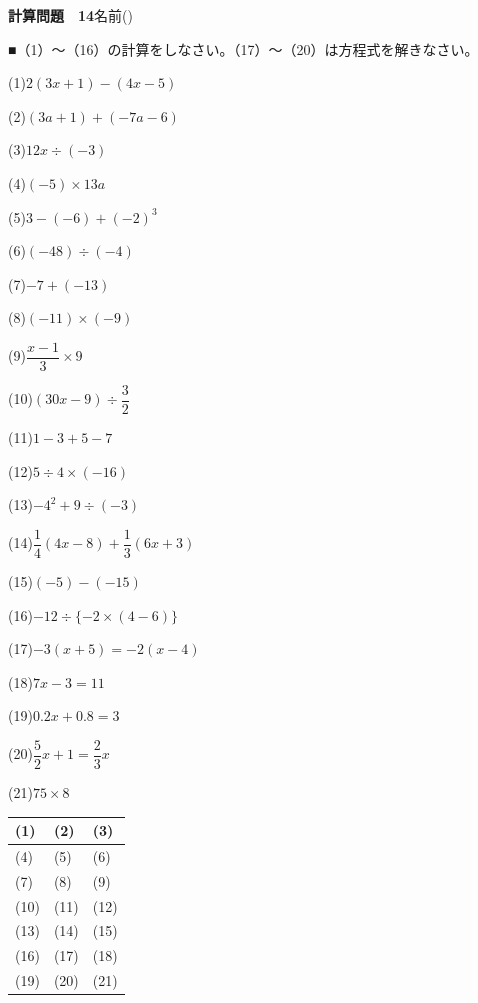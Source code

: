 \documentclass[a4paper,11pt]{ltjsarticle}
\newlength{\qcol}\setlength{\qcol}{0.47\textwidth}
\newlength{\qgap}
\newlength{\anscolw}\setlength{\anscolw}{0.30\textwidth}
\newlength{\ansh}
\newcommand{\Q}[2]{\parbox[t]{\qcol}{\raggedright (#1)\hspace{0.6em}$\displaystyle #2$}}
\newcommand{\QR}[4]{\Q{#1}{#2}\hfill\Q{#3}{#4}\par\vspace{\qgap}}
\newcommand{\anscell}[1]{\rule[-\ansdrop]{0pt}{\ansh}(#1)}
\newlength{\ansdrop}
\begin{document}
{\large\bfseries 計算問題　14}\hfill 名前(\underline{\hspace{32mm}})\par\vspace{3mm}
■（1）〜（16）の計算をしなさい。（17）〜（20）は方程式を解きなさい。\par\vspace{3mm}
\setlength{\qgap}{5.4mm}
\QR{1}{2(3x+1)-(4x-5)}{2}{(3a+1)+(-7a-6)}
\QR{3}{12x\div(-3)}{4}{(-5)\times13a}
\QR{5}{3-(-6)+(-2)^3}{6}{(-48)\div(-4)}
\QR{7}{-7+(-13)}{8}{(-11)\times(-9)}
\QR{9}{\dfrac{x-1}{3}\times9}{10}{(30x-9)\div\dfrac{3}{2}}
\QR{11}{1-3+5-7}{12}{5\div4\times(-16)}
\QR{13}{-4^2+9\div(-3)}{14}{\dfrac{1}{4}(4x-8)+\dfrac{1}{3}(6x+3)}
\QR{15}{(-5)-(-15)}{16}{-12\div\{-2\times(4-6)\}}
\QR{17}{-3(x+5)=-2(x-4)}{18}{7x-3=11}
\QR{19}{0.2x+0.8=3}{20}{\dfrac{5}{2}x+1=\dfrac{2}{3}x}
\vspace{1mm}
\Q{21}{75\times8}\par\vspace{3mm}
\setlength{\ansh}{9.5mm}\setlength{\ansdrop}{6mm}%
\begin{center}\begin{tabular}{|p{\anscolw}|p{\anscolw}|p{\anscolw}|}\hline
\anscell{1} & \anscell{2} & \anscell{3} \\\hline
\anscell{4} & \anscell{5} & \anscell{6} \\\hline
\anscell{7} & \anscell{8} & \anscell{9} \\\hline
\anscell{10} & \anscell{11} & \anscell{12} \\\hline
\anscell{13} & \anscell{14} & \anscell{15} \\\hline
\anscell{16} & \anscell{17} & \anscell{18} \\\hline
\anscell{19} & \anscell{20} & \anscell{21} \\\hline
\end{tabular}\end{center}
\end{document}
